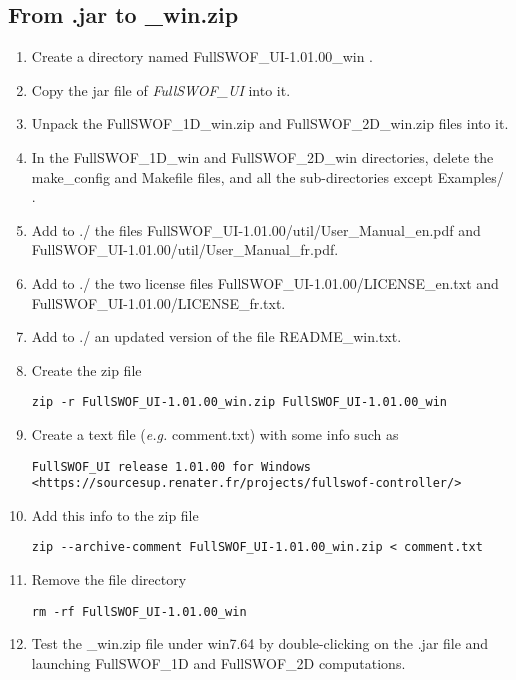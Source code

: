 \documentclass[a4paper, 11pt]{article}
\newcommand{\FullSWOFUI}{\emph{FullSWOF\_UI}}
\begin{document}
\subsection{From .jar  to \_win.zip}
\begin{enumerate}

\item Create a directory named FullSWOF\_UI-1.01.00\_win .

\item Copy the jar file of \FullSWOFUI{} into it.

\item Unpack the FullSWOF\_1D\_win.zip and FullSWOF\_2D\_win.zip files into it.

\item In the FullSWOF\_1D\_win and FullSWOF\_2D\_win directories, delete the make\_config and Makefile files, and all the sub-directories except Examples/ .

\item Add to ./ the files 
FullSWOF\_UI-1.01.00/util/User\_Manual\_en.pdf and
FullSWOF\_UI-1.01.00/util/User\_Manual\_fr.pdf.

\item Add to ./ the two license files FullSWOF\_UI-1.01.00/LICENSE\_en.txt and
FullSWOF\_UI-1.01.00/LICENSE\_fr.txt.

\item Add to ./ an updated version of the file README\_win.txt.

\item Create the zip file
\begin{verbatim}
zip -r FullSWOF_UI-1.01.00_win.zip FullSWOF_UI-1.01.00_win
\end{verbatim}
\item Create a text file (\emph{e.g.} comment.txt) with some info such as
\begin{verbatim}
FullSWOF_UI release 1.01.00 for Windows
<https://sourcesup.renater.fr/projects/fullswof-controller/>
\end{verbatim}
\item Add this info to the zip file
\begin{verbatim}
zip --archive-comment FullSWOF_UI-1.01.00_win.zip < comment.txt
\end{verbatim}
\item Remove the file directory
\begin{verbatim}
rm -rf FullSWOF_UI-1.01.00_win
\end{verbatim}
\item Test the \_win.zip file under win7.64 by
double-clicking on the .jar file and launching FullSWOF\_1D and FullSWOF\_2D computations.
\end{enumerate}
\end{document}
